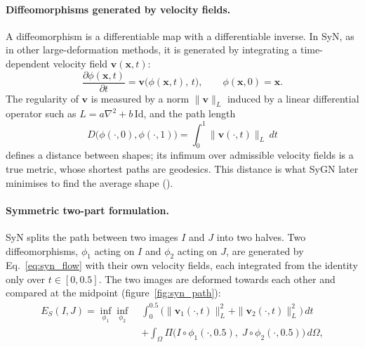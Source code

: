 \paragraph{Diffeomorphisms generated by velocity fields.}  %
A diffeomorphism is a differentiable map with a differentiable inverse. In SyN,
as in other large-deformation methods, it is generated by integrating a
time-dependent velocity field $\mathbf{v}(\mathbf{x},t)$:
\begin{equation}
  \frac{\partial \phi(\mathbf{x},t)}{\partial t}
  = \mathbf{v}\big(\phi(\mathbf{x},t),\,t\big),
  \qquad
  \phi(\mathbf{x},0) = \mathbf{x}.
  \label{eq:syn_flow}            %
\end{equation}
The regularity of $\mathbf{v}$ is measured by a norm $\|\mathbf{v}\|_L$ induced
by a linear differential operator such as $L=a\nabla^2+b\,\mathrm{Id}$, and the
path length
\begin{equation}
  D\big(\phi(\cdot,0),\phi(\cdot,1)\big)
  = \int_0^1 \|\mathbf{v}(\cdot,t)\|_L\,dt
  \label{eq:shape_distance}      %
\end{equation}
defines a distance between shapes; its infimum over admissible velocity fields is
a true metric, whose shortest paths are geodesics. This distance is what SyGN
later minimises to find the average shape ().

\paragraph{Symmetric two-part formulation.}  %
SyN splits the path between two images $I$ and $J$ into two halves. Two
diffeomorphisms, $\phi_1$ acting on $I$ and $\phi_2$ acting on $J$, are generated
by Eq.~\eqref{eq:syn_flow} with their own velocity fields, each integrated from
the identity only over $t\in[0,0.5]$. The two images are deformed towards each
other and compared at the midpoint (figure~\ref{fig:syn_path}):
\begin{equation}
  \begin{split}
    E_{S}(I,J) = \inf_{\phi_1}\inf_{\phi_2}\;
      & \int_{0}^{0.5}
        \Big( \|\mathbf{v}_1(\cdot,t)\|_L^2 + \|\mathbf{v}_2(\cdot,t)\|_L^2 \Big)\,dt \\
      & + \int_{\Omega}
        \Pi\big( I\circ\phi_1(\cdot,0.5),\; J\circ\phi_2(\cdot,0.5) \big)\,d\Omega ,
  \end{split}
  \label{eq:syn_energy}          %
\end{equation}

